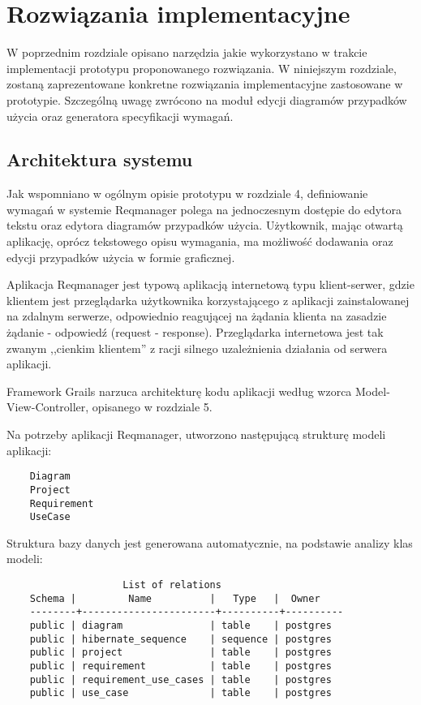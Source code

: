\chapter{Rozwiązania implementacyjne}
  
  W poprzednim rozdziale opisano narzędzia jakie wykorzystano w trakcie implementacji prototypu proponowanego rozwiązania. W niniejszym rozdziale, zostaną zaprezentowane konkretne rozwiązania implementacyjne zastosowane w prototypie. Szczególną uwagę zwrócono na moduł edycji diagramów przypadków użycia oraz generatora specyfikacji wymagań.

  \section{Architektura systemu}
    Jak wspomniano w ogólnym opisie prototypu w rozdziale 4, definiowanie wymagań w systemie Reqmanager polega na jednoczesnym dostępie do edytora tekstu oraz edytora diagramów przypadków użycia. Użytkownik, mając otwartą aplikację, oprócz tekstowego opisu wymagania, ma możliwość dodawania oraz edycji przypadków użycia w formie graficznej.

    Aplikacja Reqmanager jest typową aplikacją internetową typu klient-serwer, gdzie klientem jest przeglądarka użytkownika korzystającego z aplikacji zainstalowanej na zdalnym serwerze, odpowiednio reagującej na żądania klienta na zasadzie żądanie - odpowiedź (request - response). Przeglądarka internetowa jest tak zwanym ,,cienkim klientem'' z racji silnego uzależnienia działania od serwera aplikacji. 
    
    Framework Grails narzuca architekturę kodu aplikacji według wzorca Model-View-Controller, opisanego w rozdziale 5.  

    Na potrzeby aplikacji Reqmanager, utworzono następującą strukturę modeli aplikacji:

    \begin{verbatim}
    Diagram 
    Project
    Requirement
    UseCase
    \end{verbatim}

    Struktura bazy danych jest generowana automatycznie, na podstawie analizy klas modeli:

    \begin{verbatim}
                    List of relations
    Schema |         Name          |   Type   |  Owner
    --------+-----------------------+----------+----------
    public | diagram               | table    | postgres
    public | hibernate_sequence    | sequence | postgres
    public | project               | table    | postgres
    public | requirement           | table    | postgres
    public | requirement_use_cases | table    | postgres
    public | use_case              | table    | postgres
    \end{verbatim}



